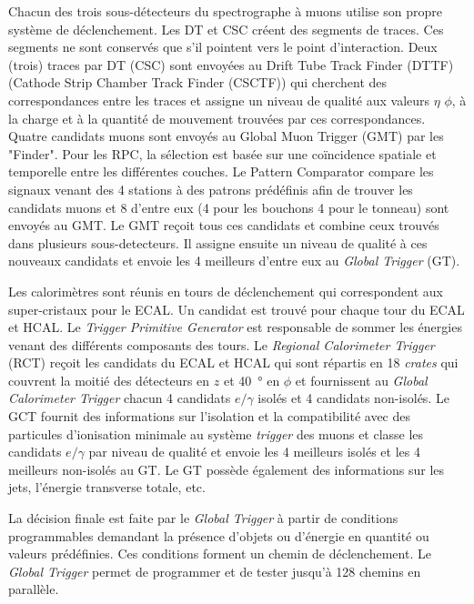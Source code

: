 Chacun des trois sous-détecteurs du spectrographe à muons utilise son propre système de déclenchement. Les DT et CSC créent des segments de traces. Ces segments ne sont conservés que s'il pointent vers le point d'interaction. Deux (trois) traces par DT (CSC) sont envoyées au Drift Tube Track Finder (DTTF) (Cathode Strip Chamber Track Finder (CSCTF)) qui cherchent des correspondances entre les traces et assigne un niveau de qualité  aux valeurs $\eta$ $\phi$, à la charge et à la quantité de mouvement trouvées par ces correspondances. Quatre candidats muons sont envoyés au Global Muon Trigger (GMT) par les "Finder". Pour les RPC, la sélection est basée sur une coïncidence spatiale et temporelle entre les différentes couches. Le Pattern Comparator compare les signaux venant des \num{4} stations à des patrons prédéfinis afin de trouver les candidats muons et \num{8} d'entre eux (\num{4} pour les bouchons \num{4} pour le tonneau) sont envoyés au GMT. Le GMT reçoit tous ces candidats et combine ceux trouvés dans plusieurs sous-detecteurs. Il assigne ensuite un niveau de qualité à ces nouveaux candidats et envoie les \num{4} meilleurs d'entre eux au \textit{Global Trigger} (GT).

Les calorimètres sont réunis en tours de déclenchement qui correspondent aux super-cristaux pour le ECAL. Un candidat est trouvé pour chaque tour du ECAL et HCAL. Le \textit{Trigger Primitive Generator} est responsable de sommer les énergies venant des différents composants des tours.  Le \textit{Regional Calorimeter Trigger} (RCT) reçoit les candidats du ECAL et HCAL qui sont répartis en \num{18} \textit{crates} qui couvrent la moitié des détecteurs en $z$ et \SI{40}{\degree} en $\phi$ et fournissent au \textit{Global Calorimeter Trigger} chacun \num{4} candidats $e/\gamma$ isolés et \num{4} candidats non-isolés. Le GCT fournit des informations sur l'isolation et la compatibilité avec des particules d'ionisation minimale au système \textit{trigger} des muons et classe les candidats $e/\gamma$ par niveau de qualité et envoie les \num{4} meilleurs isolés et les \num{4} meilleurs non-isolés au GT. Le GT possède également des informations sur les jets, l'énergie transverse totale, etc.

La décision finale est faite par le \textit{Global Trigger} à partir de conditions programmables demandant la présence d'objets ou d'énergie en quantité ou valeurs prédéfinies. Ces conditions forment un chemin de déclenchement. Le \textit{Global Trigger} permet de programmer et de tester jusqu'à \num{128} chemins en parallèle. 

